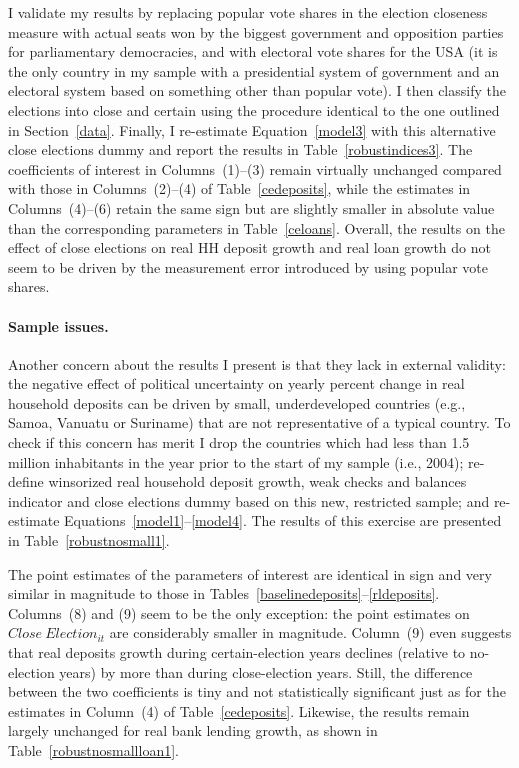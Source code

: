 \documentclass[12pt,a4paper]{article}
\begin{document}
I validate my results by replacing popular vote shares in the election closeness measure with actual seats won by the biggest government and opposition parties for parliamentary democracies, and with electoral vote shares for the USA (it is the only country in my sample with a presidential system of government and an electoral system based on something other than popular vote). I then classify the elections into close and certain using the procedure identical to the one outlined in Section~\ref{data}. Finally, I re-estimate Equation~\ref{model3} with this alternative close elections dummy and report the results in Table~\ref{robustindices3}. The coefficients of interest in Columns~(1)--(3) remain virtually unchanged compared with those in Columns~(2)--(4) of Table~\ref{cedeposits}, while the estimates in Columns~(4)--(6) retain the same sign but are slightly smaller in absolute value than the corresponding parameters in Table~\ref{celoans}. Overall, the results on the effect of close elections on real HH deposit growth and real loan growth do not seem to be driven by the measurement error introduced by using popular vote shares.

\paragraph{Sample issues.} Another concern about the results I present is that they lack in external validity: the negative effect of political uncertainty on yearly percent change in real household deposits can be driven by small, underdeveloped countries (e.g., Samoa, Vanuatu or Suriname) that are not representative of a typical country. To check if this concern has merit I drop the countries which had less than 1.5 million inhabitants in the year prior to the start of my sample (i.e., 2004); re-define winsorized real household deposit growth, weak checks and balances indicator and close elections dummy based on this new, restricted sample; and re-estimate Equations~\eqref{model1}--\eqref{model4}. The results of this exercise are presented in Table~\ref{robustnosmall1}.

The point estimates of the parameters of interest are identical in sign and very similar in magnitude to those in Tables~\ref{baselinedeposits}--\ref{rldeposits}. Columns~(8) and (9) seem to be the only exception: the point estimates on $Close\ Election_{it}$ are considerably smaller in magnitude. Column~(9) even suggests that real deposits growth during certain-election years declines (relative to no-election years) by more than during close-election years. Still, the difference between the two coefficients is tiny and not statistically significant just as for the estimates in Column~(4) of Table~\ref{cedeposits}. Likewise, the results remain largely unchanged for real bank lending growth, as shown in Table~\ref{robustnosmallloan1}.
\end{document}
